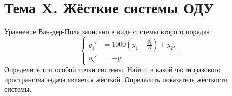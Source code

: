 \documentclass[a4paper]{article}
\begin{document}
\section*{Тема X. Жёсткие системы ОДУ}
\begin{hiProb}[7.1]
Уравнение Ван-дер-Поля записано в виде системы второго 
порядка 
\[
	\left\{
	\begin{aligned}
		y_1'&=1000 \left( y_1- \frac{y_1^3}{3} \right) +y_2
, \\
	y_2'&=-y_1
	\end{aligned}
	\right.
.\] 
Определить тип особой точки системы. Найти, в какой
части фазового пространства задача является жёсткой.
Определить показатель жёсткости системы.
\end{hiProb}
\end{document}
